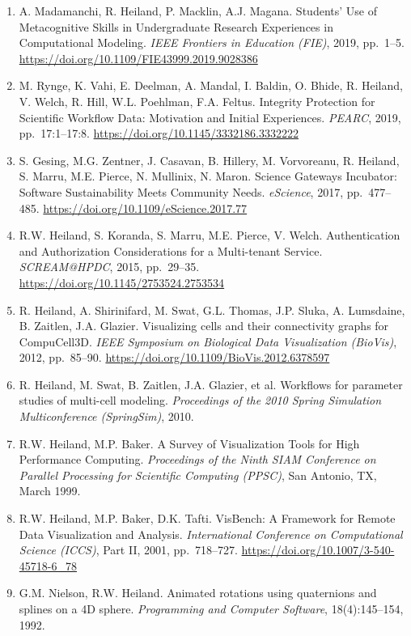 \documentclass[11pt]{article}
\begin{document}
\begin{enumerate}[leftmargin=*, itemsep=3pt, topsep=4pt]
    \item A. Madamanchi, R. Heiland, P. Macklin, A.J. Magana. Students' Use of Metacognitive Skills in Undergraduate Research Experiences in Computational Modeling. \textit{IEEE Frontiers in Education (FIE)}, 2019, pp.\ 1--5. \url{https://doi.org/10.1109/FIE43999.2019.9028386}

    \item M. Rynge, K. Vahi, E. Deelman, A. Mandal, I. Baldin, O. Bhide, R. Heiland, V. Welch, R. Hill, W.L. Poehlman, F.A. Feltus. Integrity Protection for Scientific Workflow Data: Motivation and Initial Experiences. \textit{PEARC}, 2019, pp.\ 17:1--17:8. \url{https://doi.org/10.1145/3332186.3332222}

    \item S. Gesing, M.G. Zentner, J. Casavan, B. Hillery, M. Vorvoreanu, R. Heiland, S. Marru, M.E. Pierce, N. Mullinix, N. Maron. Science Gateways Incubator: Software Sustainability Meets Community Needs. \textit{eScience}, 2017, pp.\ 477--485. \url{https://doi.org/10.1109/eScience.2017.77}

    \item R.W. Heiland, S. Koranda, S. Marru, M.E. Pierce, V. Welch. Authentication and Authorization Considerations for a Multi-tenant Service. \textit{SCREAM@HPDC}, 2015, pp.\ 29--35. \url{https://doi.org/10.1145/2753524.2753534}

    \item R. Heiland, A. Shirinifard, M. Swat, G.L. Thomas, J.P. Sluka, A. Lumsdaine, B. Zaitlen, J.A. Glazier. Visualizing cells and their connectivity graphs for CompuCell3D. \textit{IEEE Symposium on Biological Data Visualization (BioVis)}, 2012, pp.\ 85--90. \url{https://doi.org/10.1109/BioVis.2012.6378597}

    \item R. Heiland, M. Swat, B. Zaitlen, J.A. Glazier, et al. Workflows for parameter studies of multi-cell modeling. \textit{Proceedings of the 2010 Spring Simulation Multiconference (SpringSim)}, 2010.

    \item R.W. Heiland, M.P. Baker. A Survey of Visualization Tools for High Performance Computing. \textit{Proceedings of the Ninth SIAM Conference on Parallel Processing for Scientific Computing (PPSC)}, San Antonio, TX, March 1999.

    \item R.W. Heiland, M.P. Baker, D.K. Tafti. VisBench: A Framework for Remote Data Visualization and Analysis. \textit{International Conference on Computational Science (ICCS)}, Part II, 2001, pp.\ 718--727. \url{https://doi.org/10.1007/3-540-45718-6_78}

    \item G.M. Nielson, R.W. Heiland. Animated rotations using quaternions and splines on a 4D sphere. \textit{Programming and Computer Software}, 18(4):145--154, 1992.
\end{enumerate}
\end{document}
